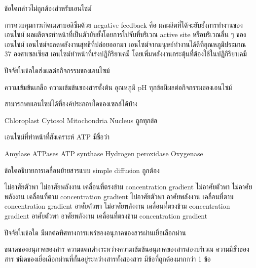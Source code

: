 \documentclass[12pt, a4paper]{exam}
\begin{document}
\begin{questions}
\filbreak
  \question ข้อใดกล่าวไม่ถูกต้องสำหรับเอนไซม์
  \begin{choices}
    \choice การควบคุมการเกิดเมตาบอลิซึมด้วย negative feedback คือ ผลผลิตที่ได้จะยับยั้งการทำงานของเอนไซม์
    \choice ผลผลิตจะทำหน้าที่เป็นตัวยับยั้งโดยการไปจับที่บริเวณ active site หรือบริเวณอื่น ๆ ของเอนไซม์
    \choice เอนไซม์จะลดพลังงานสุทธิที่ปล่อยออกมา
    \choice เอนไซม์จากมนุษย์ทำงานได้ดีที่อุณหภูมิประมาณ 37 องศาเซลเซียส
    \choice เอนไซม์ทำหน้าที่เร่งปฏิกิริยาเคมี โดยเพิ่มพลังงานกระตุ้นที่ต้องใช้ในปฏิกิริยาเคมี
\end{choices}

\filbreak
  \question ปัจจัยในข้อใดส่งผลต่อกิจกรรมของเอนไซม์
  \begin{choices}
    \choice ความเข้มข้นเกลือ
    \choice ความเข้มข้นของสารตั้งต้น
    \choice อุณหภูมิ
    \choice pH
    \choice ทุกข้อมีผลต่อกิจกรรมของเอนไซม์
\end{choices}

\filbreak
  \question สามารถพบเอนไซม์ได้ที่องค์ประกอบใดของเซลล์ได้บ้าง
  \begin{choices}
    \choice Chloroplast
    \choice Cytosol
    \choice Mitochondria
    \choice Nucleus
    \choice ถูกทุกข้อ
\end{choices}

\filbreak
  \question เอนไซม์ที่ทำหน้าที่สังเคราะห์ ATP มีชื่อว่า
  \begin{choices}
    \choice Amylase
    \choice ATPases
    \choice ATP synthase
    \choice Hydrogen peroxidase
    \choice Oxygenase
\end{choices}

\filbreak
  \question ข้อใดอธิบายการเคลื่อนย้ายสารแบบ simple diffusion ถูกต้อง
  \begin{choices}
    \choice ไม่อาศัยตัวพา ไม่อาศัยพลังงาน เคลื่อนที่ตรงข้าม concentration gradient
    \choice ไม่อาศัยตัวพา ไม่อาศัยพลังงาน เคลื่อนที่ตาม concentration gradient
    \choice ไม่อาศัยตัวพา อาศัยพลังงาน เคลื่อนที่ตาม concentration gradient
    \choice อาศัยตัวพา ไม่อาศัยพลังงาน เคลื่อนที่ตรงข้าม concentration gradient
    \choice อาศัยตัวพา อาศัยพลังงาน เคลื่อนที่ตรงข้าม concentration gradient
\end{choices}

\filbreak
  \question ปัจจัยในข้อใด มีผลต่อทิศทางการแพร่ของอนุภาคของสารผ่านเยื่อเลือกผ่าน
  \begin{choices}
    \choice ขนาดของอนุภาคของสาร
    \choice ความแตกต่างระหว่างความเข้มข้นอนุภาคของสารสองบริเวณ
    \choice ความมีขั้วของสาร
    \choice ชนิดของเยื่อเลือกผ่านที่กั้นอยู่ระหว่างสารทั้งสองสาร
    \choice มีข้อที่ถูกต้องมากกว่า 1 ข้อ
\end{choices}


\end{questions}
\end{document}

